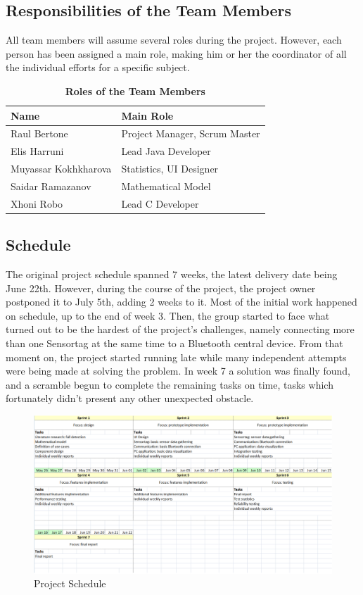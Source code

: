\documentclass[conference,12pt]{IEEETran}
\begin{document}
\subsection{Responsibilities of the Team Members}

All team members will assume several roles during the project. However, each person has been assigned a main role, making him or her the coordinator of all the individual efforts for a specific subject. 
\FloatBarrier
\begin{table}[h]
	\centering
	\caption{\textbf{Roles of the Team Members}}
	{\renewcommand{\arraystretch}{2}%
		\begin{tabular}{ | l | l | }
			\hline
			\textbf{Name} & \textbf{Main Role} \\ \hline
			Raul Bertone & Project Manager, Scrum Master \\ \hline
			Elis Harruni & Lead Java Developer \\ \hline
			Muyassar Kokhkharova & Statistics, UI Designer \\ \hline
			Saidar Ramazanov & Mathematical Model \\ \hline
			Xhoni Robo & Lead C Developer \\ \hline
	\end{tabular}}
\end{table} 

\subsection{Schedule}
The original project schedule spanned 7 weeks, the latest delivery date being June 22th. However, during the course of the project, the project owner postponed it to July 5th, adding 2 weeks to it.
Most of the initial work happened on schedule, up to the end of week 3. Then, the group started to face what turned out to be the hardest of the project’s challenges, namely connecting more than one Sensortag at the same time to a Bluetooth central device. From that moment on, the project started running late while many independent attempts were being made at solving the problem. In week 7 a solution was finally found, and a scramble begun to complete the remaining tasks on time, tasks which fortunately didn’t present any other unexpected obstacle.

\FloatBarrier
\begin{figure}[!h]
	\centering
	\includegraphics[scale=0.50]{images/Proj_Sched.png}
	\caption{Project Schedule}
	\label{img:Proj_Sched}
\end{figure}
\FloatBarrier
\end{document}
